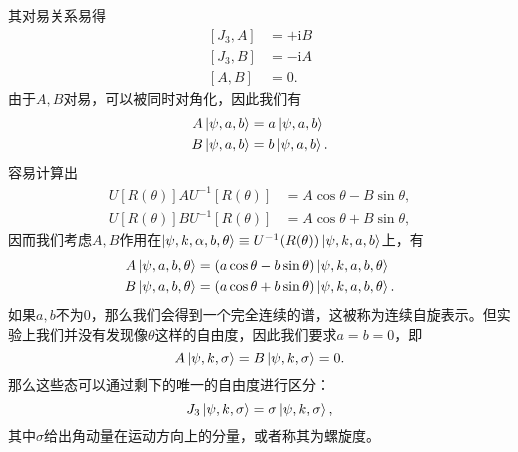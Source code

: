 其对易关系易得
\begin{equation*}
	\begin{aligned}
		[ J_{3} ,A] & =+\mathrm{i} B\\
		[ J_{3} ,B] & =-\mathrm{i} A\\
		[ A,B] & =0.
	\end{aligned}
\end{equation*}
由于$ A,B$对易，可以被同时对角化，因此我们有
\begin{equation*}
	\begin{aligned}
		A\ket{\psi ,a,b} & =a\ket{\psi ,a,b}\\
		B\ket{\psi ,a,b} & =b\ket{\psi ,a,b} .
	\end{aligned}
\end{equation*}
容易计算出
\begin{equation*}
	\begin{aligned}
		U[ R( \theta )] AU^{-1}[ R( \theta )] & =A\cos \theta -B\sin \theta ,\\
		U[ R( \theta )] BU^{-1}[ R( \theta )] & =A\cos \theta + B\sin \theta ,
	\end{aligned}
\end{equation*}
因而我们考虑$ A,B$作用在$ \ket{\psi ,k,\alpha ,b,\theta } \equiv U^{-1}( R( \theta ))\ket{\psi ,k,a,b}$上，有
\begin{equation*}
	\begin{aligned}
		A\ket{\psi ,a,b,\theta } & =( a\cos \theta -b\sin \theta )\ket{\psi ,k,a,b,\theta }\\
		B\ket{\psi ,a,b,\theta } & =( a\cos \theta +b\sin \theta )\ket{\psi ,k,a,b,\theta } .
	\end{aligned}
\end{equation*}
如果$ a,b$不为0，那么我们会得到一个完全连续的谱，这被称为连续自旋表示。但实验上我们并没有发现像$ \theta $这样的自由度，因此我们要求$ a=b=0$，即
\begin{equation*}
	A\ket{\psi ,k,\sigma } =B\ket{\psi ,k,\sigma } =0.
\end{equation*}
那么这些态可以通过剩下的唯一的自由度进行区分：
\begin{equation*}
	J_{3}\ket{\psi ,k,\sigma } =\sigma \ket{\psi ,k,\sigma } ,
\end{equation*}
其中$ \sigma $给出角动量在运动方向上的分量，或者称其为螺旋度。


